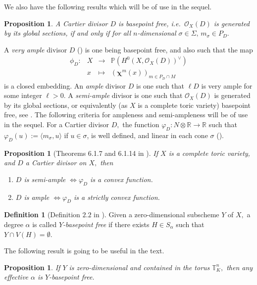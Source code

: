 \documentclass[a4paper,11pt]{amsart}
\renewcommand{\P}{\mathbb{P}}
\newcommand{\R}{\mathbb{R}}
\newcommand{\T}{\mathbb{T}}
\newcommand{\cO}{{\mathcal O}}
\newcommand{\bfchi}{{\boldsymbol{\chi}}}
\newcounter{thm}
\numberwithin{thm}{section}
\numberwithin{equation}{section}
\theoremstyle{definition}
\newtheorem{definition}[thm]{Definition}
\theoremstyle{plain}
\newtheorem{proposition}[thm]{Proposition}
\begin{document}
We also have the following results which will be of use in the sequel.
\begin{proposition}\cite[Proposition 6.1.1]{CLS11}\label{usam}
A Cartier  divisor $D$  is basepoint free, i.e.~$\cO_X(D)$ is generated by its global sections, if and only if for all $n$-dimensional $\sigma\in\Sigma,\, m_\sigma\in P_D.$
\end{proposition}


A {\em very ample} divisor $D$ (\cite[Definition 6.1.9]{CLS11}) is one being basepoint free, and also such that the map
\begin{equation}\label{phialpa}
\begin{array}{cccl}
\phi_D:& X& \to & \P(H^0(X,\cO_X(D))^\vee)\\
& x &\mapsto & (\bfchi^m(x))_{m\in P_D\cap M}
\end{array}
\end{equation}
is a closed embedding. An {\em ample} divisor $D$ is one such that $\ell D$ is very ample for some integer $\ell>0.$  A {\em semi-ample} divisor is one such that $\cO_X(D)$ is generated by its global sections, or equivalently (as $X$ is a complete toric variety)  basepoint free, see \cite[Theorem 6.3.12]{CLS11}.  The following criteria for ampleness and semi-ampleness will be of use in the sequel. For a Cartier divisor $D,$ the function $\varphi_D: N\otimes\R\to\R$ such that $\varphi_D(u):=\langle m_\sigma, u\rangle$ if $u\in\sigma$, is well defined, and linear in each cone $\sigma$ (\cite[Theorem 4.2.12]{CLS11}).
\begin{proposition}[Theorems 6.1.7 and  6.1.14 in \cite{CLS11}]\label{convex} If $X$ is a complete toric variety, and $D$ a Cartier divisor on $X,$ then
\begin{enumerate}
\item $D$ is semi-ample $\iff \varphi_D$ is a  convex function.
\item $D$ is ample $\iff \varphi_D$ is a strictly convex function.
\end{enumerate}
\end{proposition}



\begin{definition}[Definition $2.2$ in \cite{BT22}]
Given a zero-dimensional subscheme $Y$ of $X,$ a degree $\alpha$ is called {\em $Y$-basepoint free} if there exists $H\in S_\alpha$  such that $Y\cap V(H)=\emptyset.$
\end{definition}

The following result is going to be useful in the text.
\begin{proposition}\label{bpf}
If $Y$ is zero-dimensional and contained in the torus $\T_{K}^n,$ then any effective $\alpha$  is $Y$-basepoint free.
\end{proposition}
\end{document}

